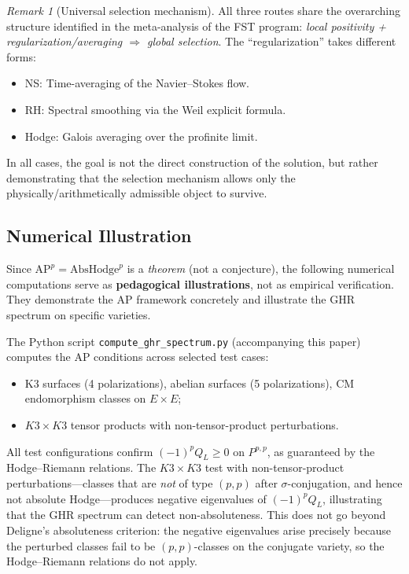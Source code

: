 \documentclass[aps,prd,twocolumn,superscriptaddress,nofootinbib]{revtex4-2}
\theoremstyle{definition}
\theoremstyle{remark}
\newtheorem{remark}[theorem]{Remark}
\begin{document}
\begin{remark}[Universal selection mechanism]
\label{rem:universal-selection}
All three routes share the overarching structure identified in the meta-analysis of the FST program: \emph{local positivity + regularization/averaging $\Rightarrow$ global selection}. The ``regularization'' takes different forms:
\begin{itemize}
\item NS: Time-averaging of the Navier--Stokes flow.
\item RH: Spectral smoothing via the Weil explicit formula.
\item Hodge: Galois averaging over the profinite limit.
\end{itemize}
In all cases, the goal is not the direct construction of the solution, but rather demonstrating that the selection mechanism allows only the physically/arithmetically admissible object to survive.
\end{remark}


\subsection{Numerical Illustration}

Since $\mathrm{AP}^p = \mathrm{AbsHodge}^p$ is a \emph{theorem} (not a conjecture), the following numerical computations serve as \textbf{pedagogical illustrations}, not as empirical verification. They demonstrate the AP framework concretely and illustrate the GHR spectrum on specific varieties.

The Python script \texttt{compute\_ghr\_spectrum.py} (accompanying this paper) computes the AP conditions across selected test cases:
\begin{itemize}
\item K3 surfaces (4 polarizations), abelian surfaces (5 polarizations), CM endomorphism classes on $E \times E$;
\item $K3 \times K3$ tensor products with non-tensor-product perturbations.
\end{itemize}

All test configurations confirm $(-1)^p Q_L \geq 0$ on $P^{p,p}$, as guaranteed by the Hodge--Riemann relations. The $K3 \times K3$ test with non-tensor-product perturbations---classes that are \emph{not} of type $(p,p)$ after $\sigma$-conjugation, and hence not absolute Hodge---produces negative eigenvalues of $(-1)^p Q_L$, illustrating that the GHR spectrum can detect non-absoluteness. This does not go beyond Deligne's absoluteness criterion: the negative eigenvalues arise precisely because the perturbed classes fail to be $(p,p)$-classes on the conjugate variety, so the Hodge--Riemann relations do not apply.
\end{document}
